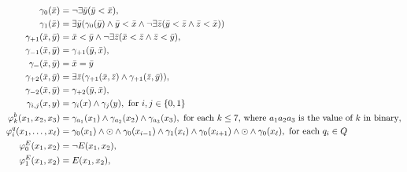 \begin{align*}
\gamma_{0}(\bar{x}) &= \neg\exists\bar{y}(\bar{y}<\bar{x}),\\
\gamma_{1}(\bar{x}) &= \exists\bar{y}(\gamma_{0}(\bar{y})\wedge \bar{y} < \bar{x} \wedge \neg\exists\bar{z}(\bar{y}<\bar{z}\wedge\bar{z}<\bar{x}))\\
\gamma_{+1}(\bar{x},\bar{y}) &= \bar{x} < \bar{y} \wedge \neg\exists \bar{z}(\bar{x}<\bar{z} \wedge \bar{z}<\bar{y}), \\
\gamma_{-1}(\bar{x},\bar{y}) &= \gamma_{+1}(\bar{y},\bar{x}),\\
\gamma_{=}(\bar{x},\bar{y}) &= \bar{x} = \bar{y} \\
\gamma_{+2}(\bar{x},\bar{y}) &= \exists\bar{z}(\gamma_{+1}(\bar{x},\bar{z}) \wedge \gamma_{+1}(\bar{z},\bar{y})),\\
\gamma_{-2}(\bar{x},\bar{y}) &= \gamma_{+2}(\bar{y},\bar{x}),\\
\gamma_{i,j}(x,y) &= \gamma_i(x) \wedge \gamma_j(y),\text{ for $i,j \in\{0,1\}$}\\
\varphi^b_k(x_1,x_2,x_3) &= \gamma_{a_1}(x_1) \wedge \gamma_{a_2}(x_2) \wedge \gamma_{a_3}(x_3),\text{ for each $k \leq 7$, where $a_1a_2a_3$ is the value of $k$ in binary}, \\
\varphi^q_i(x_1,\ldots,x_{\ell}) &= \gamma_0(x_1) \wedge \odot \wedge \gamma_0(x_{i-1}) \wedge \gamma_1(x_i) \wedge \gamma_0(x_{i+1}) \wedge \odot \wedge \gamma_0(x_{\ell}), \text{ for each } q_i\in Q\\
\varphi^E_0(x_1,x_2) &= \neg E(x_1,x_2),\\		\varphi^E_1(x_1,x_2) &= E(x_1,x_2),\\
\end{align*}

